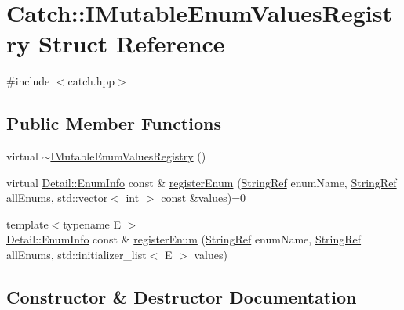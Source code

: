 \hypertarget{struct_catch_1_1_i_mutable_enum_values_registry}{}\section{Catch\+:\+:I\+Mutable\+Enum\+Values\+Registry Struct Reference}
\label{struct_catch_1_1_i_mutable_enum_values_registry}


{\ttfamily \#include $<$catch.\+hpp$>$}

\subsection*{Public Member Functions}
\begin{DoxyCompactItemize}
\item 
virtual \mbox{\hyperlink{struct_catch_1_1_i_mutable_enum_values_registry_aebd423693128987c89ac732478d74673}{$\sim$\+I\+Mutable\+Enum\+Values\+Registry}} ()
\item 
virtual \mbox{\hyperlink{struct_catch_1_1_detail_1_1_enum_info}{Detail\+::\+Enum\+Info}} const  \& \mbox{\hyperlink{struct_catch_1_1_i_mutable_enum_values_registry_a948e66e85f5b66ab68256d50bfe548f4}{register\+Enum}} (\mbox{\hyperlink{class_catch_1_1_string_ref}{String\+Ref}} enum\+Name, \mbox{\hyperlink{class_catch_1_1_string_ref}{String\+Ref}} all\+Enums, std\+::vector$<$ int $>$ const \&values)=0
\item 
{\footnotesize template$<$typename E $>$ }\\\mbox{\hyperlink{struct_catch_1_1_detail_1_1_enum_info}{Detail\+::\+Enum\+Info}} const  \& \mbox{\hyperlink{struct_catch_1_1_i_mutable_enum_values_registry_a60e4546c6fd45f9be68e43410403b562}{register\+Enum}} (\mbox{\hyperlink{class_catch_1_1_string_ref}{String\+Ref}} enum\+Name, \mbox{\hyperlink{class_catch_1_1_string_ref}{String\+Ref}} all\+Enums, std\+::initializer\+\_\+list$<$ E $>$ values)
\end{DoxyCompactItemize}


\subsection{Constructor \& Destructor Documentation}
\mbox{\label{struct_catch_1_1_i_mutable_enum_values_registry_aebd423693128987c89ac732478d74673}} 
